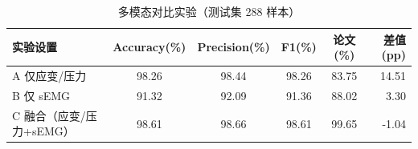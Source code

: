 \begin{table}[htbp]\centering
\caption{多模态对比实验（测试集 288 样本）}
\label{tab:modality}
\begin{tabular}{lccccr}
\toprule
实验设置 & Accuracy(\%) & Precision(\%) & F1(\%) & 论文(\%) & 差值(pp) \\
\midrule
A 仅应变/压力 & 98.26 & 98.44 & 98.26 & 83.75 & 14.51 \\
B 仅 sEMG & 91.32 & 92.09 & 91.36 & 88.02 & 3.30 \\
C 融合（应变/压力+sEMG） & 98.61 & 98.66 & 98.61 & 99.65 & -1.04 \\
\bottomrule
\end{tabular}
\end{table}
